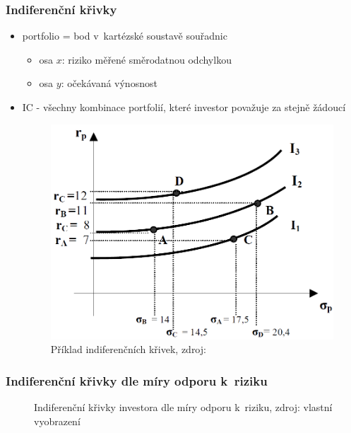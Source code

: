   \begin{frame}
    \frametitle{Indiferenční křivky}
    \begin{itemize}
      \item portfolio = bod v~kartézské soustavě souřadnic
      \begin{itemize}
			\item osa $x$: riziko měřené směrodatnou odchylkou
			\item osa $y$: očekávaná výnosnost
		\end{itemize}
      \item IC - všechny kombinace portfolií, které investor považuje za stejně žádoucí
    \begin{figure}[htb]
\centering
\includegraphics[width=.4\textwidth]{IC0.png}
\caption{Příklad indiferenčních křivek, zdroj: \cite{camsky} \label{obr_IC}}
\end{figure}
    \end{itemize}
  \end{frame}
  
  \begin{frame}
    \frametitle{Indiferenční křivky dle míry odporu k~riziku}
    \begin{figure}[htb]
\centering
{} 
\caption{Indiferenční křivky investora dle míry odporu k~riziku, zdroj: vlastní vyobrazení \label{obr_ICs}}
\end{figure}
  \end{frame}

